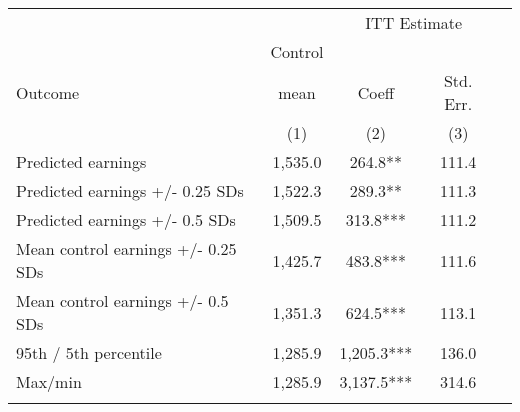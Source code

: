 \begin{tabular}{lcccc}
\hline \noalign{\smallskip} &  & \multicolumn{2}{c}{{ ITT Estimate}} & \\
\cline{3-4} & Control &  &  & \\
Outcome & mean & Coeff & Std. Err. & \\
 & (1) & (2) & (3) & \\
\noalign{\smallskip}\hline \noalign{\smallskip}Predicted earnings & 1,535.0 & 264.8** & 111.4 & \\
Predicted earnings +/- 0.25 SDs & 1,522.3 & 289.3** & 111.3 & \\
Predicted earnings +/- 0.5 SDs & 1,509.5 & 313.8*** & 111.2 & \\
Mean control earnings +/- 0.25 SDs & 1,425.7 & 483.8*** & 111.6 & \\
Mean control earnings +/- 0.5 SDs & 1,351.3 & 624.5*** & 113.1 & \\
95th / 5th percentile & 1,285.9 & 1,205.3*** & 136.0 & \\
Max/min & 1,285.9 & 3,137.5*** & 314.6 & \\
\noalign{\smallskip}\hline\end{tabular}\\
